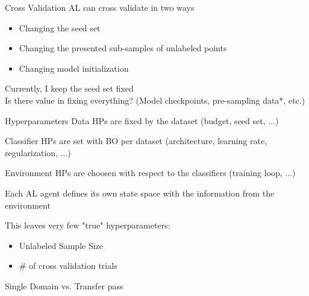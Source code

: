 \documentclass[aspectratio=169, 11pt, invertlogo]{ismll-slides}
\begin{document}

\begin{frame}[fragile]{Cross Validation}
	AL can cross validate in two ways
	\begin{itemize}
		\item Changing the seed set
		\item Changing the presented sub-samples of unlabeled points
		\item Changing model initialization
	\end{itemize}
	Currently, I keep the seed set fixed \\ [2mm]
	Is there value in fixing everything? (Model checkpoints, pre-sampling data*, etc.)
\end{frame}


\begin{frame}[fragile]{Hyperparameters}
	Data HPs are fixed by the dataset (budget, seed set, ...)
	
	Classifier HPs are set with BO per dataset (architecture, learning rate, regularization, ...)
	
	Environment HPs are choosen with respect to the classifiers (training loop, ...)
	
	Each AL agent defines its own state space with the information from the environment
	
	This leaves very few "true" hyperparameters: 
	\begin{itemize}
		\item Unlabeled Sample Size
		\item \# of cross validation trials
	\end{itemize}
\end{frame}


\begin{frame}[fragile]{Single Domain vs. Transfer}
	pass
\end{frame}
\end{document}
